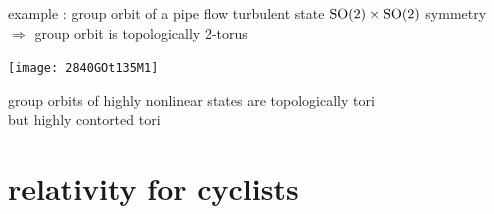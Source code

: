 \begin{frame}{example : group orbit of a pipe flow turbulent state}
$\textrm{SO}(2)\times\textrm{SO}(2)$ symmetry
$\Rightarrow$
group orbit is topologically 2-torus
\begin{center}
\texttt{[image: 2840GOt135M1]} %
\end{center}

group orbits of highly nonlinear states are topologically tori
\\
but highly contorted tori

\end{frame}


\section[relativity for cyclists]{relativity for cyclists}

\subsection[in/equivariance]{}

